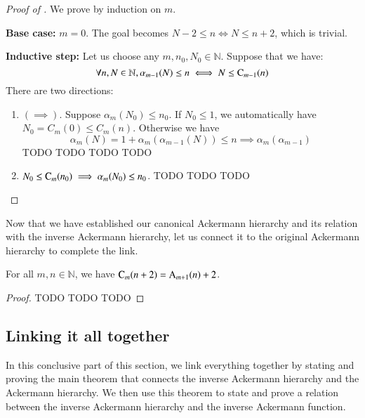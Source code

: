\begin{proof}[Proof of ]
We prove by induction on $m$.

\noindent\textbf{Base case:} $m = 0$. The goal becomes $N - 2\le n \iff N\le n + 2$, which is trivial.

\noindent\textbf{Inductive step:} Let us choose any $m, n_0, N_0\in \mathbb{N}$. Suppose that we have:
\begin{equation}
\forall n, N\in \mathbb{N}, \alpha_{m-1}(N) \le n \iff N \le \text{C}_{m-1}(n)
\end{equation}
There are two directions:
\begin{enumerate}[leftmargin=*]
	\item $(\implies)$. Suppose $\alpha_m(N_0) \le n_0$. If $N_0\le 1$, we automatically have $N_0 = C_m(0)\le C_m(n)$. Otherwise we have
	\begin{equation*}
	\alpha_m(N) = 1 + \alpha_m(\alpha_{m-1}(N)) \le n
	\implies \alpha_m(\alpha_{m-1})
	\end{equation*}
	TODO TODO TODO TODO
	
	\item $N_0\le \text{C}_m(n_0) \implies \alpha_m(N_0) \le n_0$. TODO TODO TODO
\end{enumerate}

\end{proof}

Now that we have established our canonical Ackermann hierarchy and its relation with the inverse Ackermann hierarchy, let us connect it to the original Ackermann hierarchy to complete the link.

\begin{thm} \label{thm: can_ack_ack}
For all $m, n\in \mathbb{N}$, we have $\text{C}_m(n+2) = \text{A}_{m+1}(n) + 2$.
\end{thm}

\begin{proof}
TODO TODO TODO
\end{proof}

\subsection{Linking it all together}

In this conclusive part of this section, we link everything together by stating and proving the main theorem that connects the inverse Ackermann hierarchy and the Ackermann hierarchy. We then use this theorem to state and prove a relation between the inverse Ackermann hierarchy and the inverse Ackermann function.

